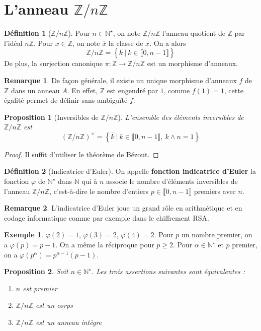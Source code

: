 \documentclass[french]{book}
\newcommand{\N}{\mathbb{N}}
\newcommand{\Z}{\mathbb{Z}}
\newcommand{\st}{^\star}
\theoremstyle{plain}
\newtheorem{prop}{Proposition}[chapter]
\theoremstyle{definition}
\newtheorem{dfn}{Définition}[chapter]
\newtheorem{exa}{Exemple}[chapter]
\newtheorem{rmq}{Remarque}[chapter]
\theoremstyle{remark}
\begin{document}
\section{L'anneau $\Z/n\Z$}
\begin{dfn}[$\Z/n\Z$]
	Pour $n\in\N\st$, on note $\Z/n\Z$ l'anneau quotient de $\Z$ par l'idéal $n\Z$. Pour $x\in\Z$, on note $\overline{x}$ la classe de $x$. On a alors $$\Z/n\Z=\left\{\overline{k}\ | \ k\in\llbracket0,n-1\rrbracket\right\}$$ De plus, la surjection canonique $\pi:\Z\rightarrow\Z/n\Z$ est un morphisme d'anneaux.
\end{dfn}
\begin{rmq}
	De façon générale, il existe un unique morphisme d'anneaux $f$ de $\Z$ dans un anneau $A$. En effet, $\Z$ est engendré par $1$, comme $f(1)=1$, cette égalité permet de définir sans ambiguïté $f$.
\end{rmq}
\begin{prop}[Inversibles de $\Z/n\Z$]
	L'ensemble des éléments inversibles de $\Z/n\Z$ est $$(\Z/n\Z)^\times=\left\{\overline{k}\ | \ k\in\llbracket0,n-1\rrbracket,\ k\wedge n=1\right\}$$
\end{prop}
\begin{proof}
	Il suffit d'utiliser le théorème de Bézout.
\end{proof}
\begin{dfn}[Indicatrice d'Euler]
	On appelle \textbf{fonction indicatrice d'Euler} la fonction $\varphi$ de $\N\st$ dans $\N$ qui à $n$ associe le nombre d'éléments inversibles de l'anneau $\Z/n\Z$, c'est-à-dire le nombre d'entiers $p\in\llbracket0,n-1\rrbracket$ premiers avec $n$.
\end{dfn}
\begin{rmq}
	L'indicatrice d'Euler joue un grand rôle en arithmétique et en codage informatique comme par exemple dans le chiffrement RSA.
\end{rmq}
\begin{exa}
	$\varphi(2)=1$, $\varphi(3)=2$, $\varphi(4)=2$. Pour $p$ un nombre premier, on a $\varphi(p)=p-1$. On a même la réciproque pour $p\geqslant2$. Pour $\alpha\in\N\st$ et $p$ premier, on a $\varphi(p^\alpha)=p^{\alpha-1}(p-1)$.
\end{exa}
\begin{prop}
	Soit $n\in\N\st$. Les trois assertions suivantes sont équivalentes :
	\begin{enumerate}
		\item $n$ est premier
		\item $\Z/n\Z$ est un corps
		\item $\Z/n\Z$ est un anneau intègre
	\end{enumerate}
\end{prop}
\end{document}
